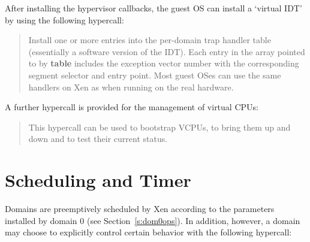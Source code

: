 \documentclass[11pt,twoside,final,openright,a4paper]{report}
\newcommand{\hypercall}[1]{\vspace{2mm}{\sf #1}}
\begin{document}
\begin{quote}
\hypercall{set\_callbacks(unsigned long event\_address, unsigned long
  failsafe\_address, unsigned long syscall\_address)}
\end{quote} 


After installing the hypervisor callbacks, the guest OS can 
install a `virtual IDT' by using the following hypercall: 

\begin{quote} 
\hypercall{set\_trap\_table(trap\_info\_t *table)} 

Install one or more entries into the per-domain 
trap handler table (essentially a software version of the IDT). 
Each entry in the array pointed to by {\bf table} includes the 
exception vector number with the corresponding segment selector 
and entry point. Most guest OSes can use the same handlers on 
Xen as when running on the real hardware.


\end{quote} 

A further hypercall is provided for the management of virtual CPUs:

\begin{quote}
\hypercall{vcpu\_op(int cmd, int vcpuid, void *extra\_args)}

This hypercall can be used to bootstrap VCPUs, to bring them up and
down and to test their current status.

\end{quote}

\section{Scheduling and Timer}

Domains are preemptively scheduled by Xen according to the 
parameters installed by domain 0 (see Section~\ref{s:dom0ops}). 
In addition, however, a domain may choose to explicitly 
control certain behavior with the following hypercall: 
\end{document}
